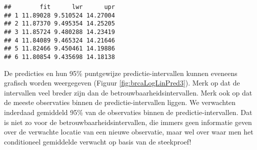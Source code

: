 \documentclass[12pt,dutch,coursenotes]{book}
\newenvironment{Shaded}{\begin{snugshade}}{\end{snugshade}}
\newcommand{\KeywordTok}[1]{\textcolor[rgb]{0.13,0.29,0.53}{\textbf{#1}}}
\newcommand{\DataTypeTok}[1]{\textcolor[rgb]{0.13,0.29,0.53}{#1}}
\newcommand{\DecValTok}[1]{\textcolor[rgb]{0.00,0.00,0.81}{#1}}
\newcommand{\StringTok}[1]{\textcolor[rgb]{0.31,0.60,0.02}{#1}}
\newcommand{\OperatorTok}[1]{\textcolor[rgb]{0.81,0.36,0.00}{\textbf{#1}}}
\newcommand{\NormalTok}[1]{#1}
\theoremstyle{definition}
\theoremstyle{definition}
\theoremstyle{definition}
\theoremstyle{remark}
\begin{document}
\begin{verbatim}
##        fit      lwr      upr
## 1 11.89028 9.510524 14.27004
## 2 11.87370 9.495354 14.25205
## 3 11.85724 9.480288 14.23419
## 4 11.84089 9.465324 14.21646
## 5 11.82466 9.450461 14.19886
## 6 11.80854 9.435698 14.18138
\end{verbatim}

De predicties en hun 95\% puntgewijze predictie-intervallen kunnen
eveneens grafisch worden weergegeven (Figuur \ref{fig:brcaLogLinPred3}).
Merk op dat de intervallen veel breder zijn dan de
betrouwbaarheidsintervallen. Merk ook op dat de meeste observaties
binnen de predictie-intervallen liggen. We verwachten inderdaad
gemiddeld 95\% van de observaties binnen de predictie-intervallen. Dat
is niet zo voor de betrouwbaarheidsintervallen, die immers geen
informatie geven over de verwachte locatie van een nieuwe observatie,
maar wel over waar men het conditioneel gemiddelde verwacht op basis van
de steekproef!

\begin{Shaded}
\end{Shaded}
\end{document}

